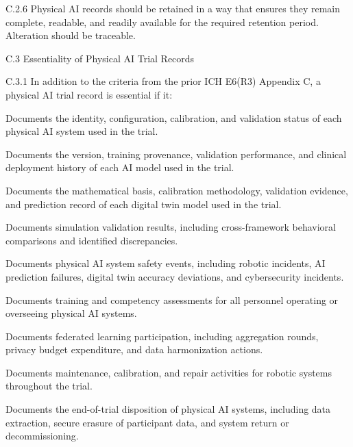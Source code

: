 C.2.6 Physical AI records should be retained in a way that ensures they remain complete, readable, and readily available for the required retention period. Alteration should be traceable.

C.3 Essentiality of Physical AI Trial Records

C.3.1 In addition to the criteria from the prior ICH E6(R3) Appendix C, a physical AI trial record is essential if it:

\begin{description}[leftmargin=2.5cm,style=sameline]

\item[(a)] Documents the identity, configuration, calibration, and validation status of each physical AI system used in the trial.

\item[(b)] Documents the version, training provenance, validation performance, and clinical deployment history of each AI model used in the trial.

\item[(c)] Documents the mathematical basis, calibration methodology, validation evidence, and prediction record of each digital twin model used in the trial.

\item[(d)] Documents simulation validation results, including cross-framework behavioral comparisons and identified discrepancies.

\item[(e)] Documents physical AI system safety events, including robotic incidents, AI prediction failures, digital twin accuracy deviations, and cybersecurity incidents.

\item[(f)] Documents training and competency assessments for all personnel operating or overseeing physical AI systems.

\item[(g)] Documents federated learning participation, including aggregation rounds, privacy budget expenditure, and data harmonization actions.

\item[(h)] Documents maintenance, calibration, and repair activities for robotic systems throughout the trial.

\item[(i)] Documents the end-of-trial disposition of physical AI systems, including data extraction, secure erasure of participant data, and system return or decommissioning.

\end{description}

